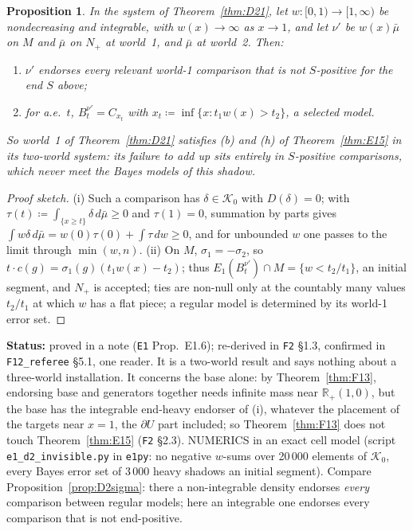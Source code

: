 \documentclass[11pt]{article}
\newtheorem{proposition}[theorem]{Proposition}
\theoremstyle{definition}
\theoremstyle{remark}
\newcommand{\R}{\mathbb R}
\newcommand{\src}[1]{\texttt{#1}}
\newcommand{\status}[1]{\par\smallskip\noindent\textbf{Status:} #1\par\smallskip}
\begin{document}
\begin{proposition}\label{prop:E16}
In the system of Theorem~\ref{thm:D21}, let $w:[0,1)\to[1,\infty)$ be nondecreasing and integrable, with $w(x)\to\infty$ as $x\to1$, and let $\nu'$ be $w(x)\bar\mu$ on $M$ and $\bar\mu$ on $N_+$ at world~1, and $\bar\mu$ at world~2. Then:
\begin{enumerate}[leftmargin=*,label=(\roman*)]
\item $\nu'$ endorses every relevant world-1 comparison that is not $S$-positive for the end $S$ above;
\item for a.e.\ $t$, $B^{\nu'}_t=C_{x_t}$ with $x_t\coloneqq\inf\{x:t_1w(x)>t_2\}$, a selected model.
\end{enumerate}
So world~1 of Theorem~\ref{thm:D21} satisfies (b) and (h) of Theorem~\ref{thm:E15} in its two-world system: its failure to add up sits entirely in $S$-positive comparisons, which never meet the Bayes models of this shadow.
\end{proposition}
\begin{proof}[Proof sketch]
(i) Such a comparison has $\delta\in\mathcal K_0$ with $D(\delta)=0$; with $\tau(t)\coloneqq\int_{\{x\ge t\}}\delta\,d\bar\mu\ge0$ and $\tau(1)=0$, summation by parts gives $\int w\delta\,d\bar\mu=w(0)\tau(0)+\int\tau\,dw\ge0$, and for unbounded $w$ one passes to the limit through $\min(w,n)$. (ii) On $M$, $\sigma_1=-\sigma_2$, so $t\cdot c(g)=\sigma_1(g)(t_1w(x)-t_2)$; thus $E_1(B^{\nu'}_t)\cap M=\{w<t_2/t_1\}$, an initial segment, and $N_+$ is accepted; ties are non-null only at the countably many values $t_2/t_1$ at which $w$ has a flat piece; a regular model is determined by its world-1 error set.
\end{proof}
\status{proved in a note (\src{E1} Prop.~E1.6); re-derived in \src{F2} \S1.3, confirmed in \src{F12\_referee} \S5.1, one reader. It is a two-world result and says nothing about a three-world installation. It concerns the base alone: by Theorem~\ref{thm:F13}, endorsing base and generators together needs infinite mass near $\R_+(1,0)$, but the base has the integrable end-heavy endorser of (i), whatever the placement of the targets near $x=1$, the $\partial U$ part included; so Theorem~\ref{thm:F13} does not touch Theorem~\ref{thm:E15} (\src{F2} \S2.3). NUMERICS in an exact cell model (script \src{e1\_d2\_invisible.py} in \src{e1py}: no negative $w$-sums over 20\,000 elements of $\mathcal K_0$, every Bayes error set of 3\,000 heavy shadows an initial segment). Compare Proposition~\ref{prop:D2sigma}: there a non-integrable density endorses \emph{every} comparison between regular models; here an integrable one endorses every comparison that is not end-positive.}
\end{document}
